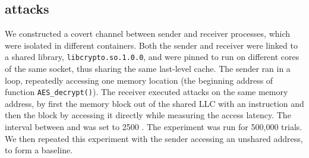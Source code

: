 \subsection{\flushreload attacks}
\label{cachebar:sec:eval:security:flushreload}
We
constructed a \flushreload covert channel between sender and
receiver processes, which were isolated in different containers. Both
the sender and receiver were linked to a shared library,
\texttt{libcrypto.so.1.0.0}, and were pinned to run on different cores
of the same socket, thus sharing the same last-level cache. The sender
ran in a loop, repeatedly accessing one memory location (the beginning
address of function \texttt{AES\_decrypt()}). The receiver executed
\flushreload attacks on the same memory address, by first 
the memory block out of the shared \gls{LLC} with an \clflush instruction
and then  the block by accessing it directly
while measuring the access latency. The interval between \Flush and
\Reload was set to 2500 \cycles. The experiment was run for 500,000
\flushreload trials.  We then repeated this experiment with the sender
accessing an unshared address, to form a baseline.

